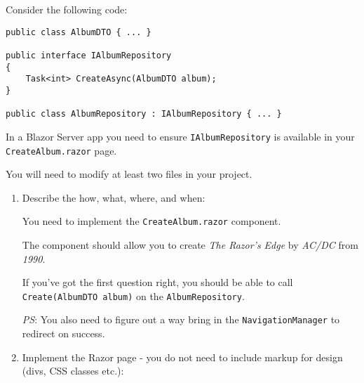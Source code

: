 
\pgfmathsetmacro{}

\noindent Consider the following code:

\begin{lstlisting}
public class AlbumDTO { ... }

public interface IAlbumRepository
{
    Task<int> CreateAsync(AlbumDTO album);
}

public class AlbumRepository : IAlbumRepository { ... }
\end{lstlisting}

\noindent In a Blazor Server app you need to ensure \texttt{IAlbumRepository} is available in your \texttt{CreateAlbum.razor} page.

\noindent You will need to modify at least two files in your project.




\vskip 15pt
\begin{enumerate}[a]
    \item {} Describe the how, what, where, and when:
		\ifdefined\questionNineAnswerA
		  \newline\answer\questionNineAnswerA
		\else
		  \\
		\fi





\noindent You need to implement the \texttt{CreateAlbum.razor} component.

\noindent The component should allow you to create \textit{The Razor's Edge} by \textit{AC/DC} from \textit{1990}.

\noindent If you've got the first question right, you should be able to call \texttt{Create(AlbumDTO album)} on the \texttt{AlbumRepository}.

\noindent \textit{PS}: You also need to figure out a way bring in the \texttt{NavigationManager} to redirect on success.




\newpage
    \item {} Implement the Razor page - you do not need to include markup for design (divs, CSS classes etc.):
		



\end{enumerate}
